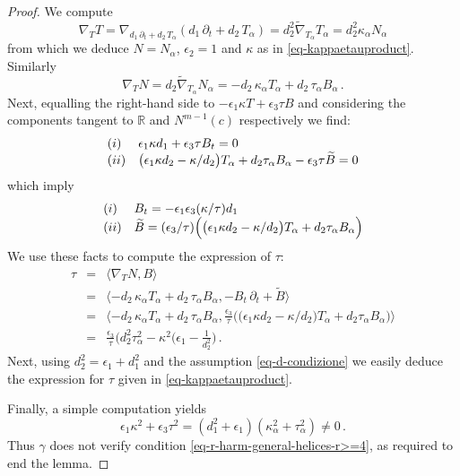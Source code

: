 \documentclass[10pt,a4paper]{amsart}
\def \R{{\mathbb R}}
\begin{document}
\begin{proof} We compute
\[
\nabla_T T= \nabla_{ d_1\, \partial_t+d_2\, T_\alpha} \left ( d_1\, \partial_t+d_2\, T_\alpha\right )=d_2^2 \widetilde{\nabla}_{T_\alpha} T_{\alpha}= d_2^2 \kappa_\alpha N_\alpha
\]
from which we deduce $N=N_\alpha$, $\epsilon_2=1$ and $\kappa$ as in \eqref{eq-kappaetauproduct}. Similarly
\[
\nabla_T N=d_2 \widetilde{\nabla}_{T_\alpha} N_\alpha=-d_2\, \kappa_\alpha T_\alpha + d_2\, \tau_\alpha B_\alpha\,.
\]
Next, equalling the right-hand side to $-\epsilon_1 \kappa T + \epsilon_3 \tau B$ and considering the components tangent to $\R$ and $N^{m-1}(c)$ respectively we find:
\begin{equation*}\label{eq-1-lemma}
\begin{array}{ll}
{\rm (i)}& \epsilon_1 \kappa d_1 + \epsilon_3 \tau B_t=0 \\
{\rm (ii)}& \big (\epsilon_1 \kappa d_2-\kappa/d_2 \big )T_\alpha + d_2 \tau_\alpha B_\alpha-\epsilon_3 \tau \widetilde{B}=0
\end{array}
\end{equation*}
which imply
\begin{equation}\label{eq-2-lemma}
\begin{array}{ll}
{\rm (i)}& B_t=-\epsilon_1 \epsilon_3 (\kappa / \tau) d_1 \\
{\rm (ii)}& \widetilde{B}=(\epsilon_3 /  \tau)\Big (\big (\epsilon_1 \kappa d_2-\kappa/d_2 \big )T_\alpha + d_2\tau_\alpha B_\alpha\Big )
\end{array}
\end{equation}
We use these facts to compute the expression of $\tau$:
\begin{eqnarray}\nonumber
\tau&=& \langle \nabla_T N,B \rangle \\\nonumber
&=&\langle -d_2\, \kappa_\alpha T_\alpha + d_2\, \tau_\alpha B_\alpha,-B_t \,\partial_t + \widetilde{B} \rangle\\
&=&\langle -d_2\, \kappa_\alpha T_\alpha + d_2\, \tau_\alpha B_\alpha,\frac{\epsilon_3}{\tau} \Big (\big (\epsilon_1 \kappa d_2-\kappa/d_2 \big )T_\alpha + d_2 \tau_\alpha B_\alpha\Big )\rangle\\\nonumber
&=&\frac{\epsilon_3}{\tau} \Big (d_2^2 \tau^2_\alpha -\kappa^2(\epsilon_1-\frac{1}{d_2^2} \Big )\,.
\end{eqnarray}
Next, using $d_2^2=\epsilon_1+d_1^2$ and the assumption \eqref{eq-d-condizione} we easily deduce the expression for $\tau$ given in \eqref{eq-kappaetauproduct}.

Finally, a simple computation yields
\[
\epsilon_1 \kappa^2 +\epsilon_3 \tau^2 =\left(d_1^2+\epsilon_1 \right)\left(\kappa^2_\alpha +\tau^2_\alpha \right )\neq 0\,.
\]
Thus $\gamma$ does not verify condition \eqref{eq-r-harm-general-helices-r>=4}, as required to end the lemma.
\end{proof}
\end{document}
